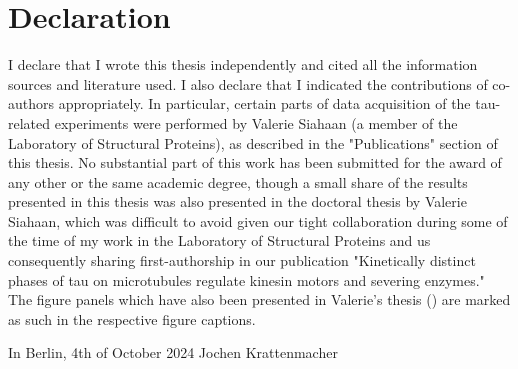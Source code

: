 \chapter*{Declaration}
I declare that I wrote this thesis independently and cited all the information sources and literature used. I also declare that I indicated the contributions of co-authors appropriately. In particular, certain parts of data acquisition of the tau-related experiments were performed by Valerie Siahaan (a member of the Laboratory of Structural Proteins), as described in the "Publications" section of this thesis. No substantial part of this work has been submitted for the award of any other or the same academic degree, though a small share of the results presented in this thesis was also presented in the doctoral thesis by Valerie Siahaan, which was difficult to avoid given our tight collaboration during some of the time of my work in the Laboratory of Structural Proteins and us consequently sharing first-authorship in our publication "Kinetically distinct phases of tau on microtubules regulate kinesin motors and severing enzymes." The figure panels which have also been presented in Valerie's thesis (\cite{Siahaan}) are marked as such in the respective figure captions.\\

\begin{minipage}{5in}
    \vspace{0.5in}
    In Berlin, 4th of October 2024 \hfill Jochen Krattenmacher
\end{minipage}